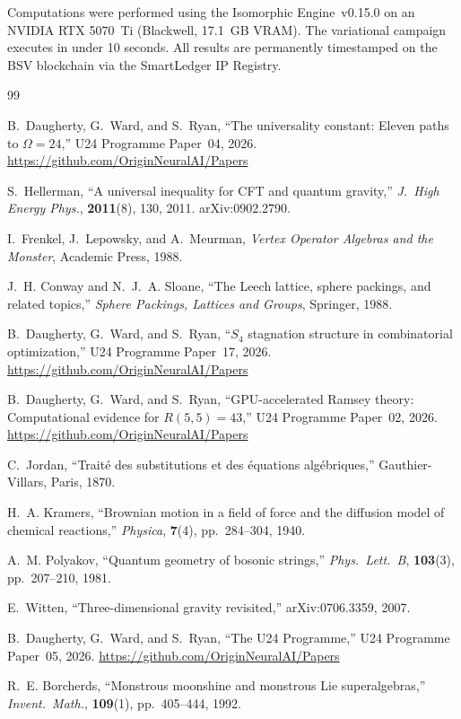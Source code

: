 \documentclass[12pt,a4paper]{article}
\theoremstyle{definition}
\theoremstyle{remark}
\begin{document}
Computations were performed using the Isomorphic Engine~v0.15.0 on an NVIDIA RTX 5070~Ti (Blackwell, 17.1~GB VRAM).  The variational campaign executes in under 10 seconds.  All results are permanently timestamped on the BSV blockchain via the SmartLedger IP Registry.


\begin{thebibliography}{99}

B.~Daugherty, G.~Ward, and S.~Ryan,
``The universality constant: Eleven paths to $\Omega = 24$,''
U24 Programme Paper~04, 2026.
\url{https://github.com/OriginNeuralAI/Papers}

S.~Hellerman,
``A universal inequality for CFT and quantum gravity,''
\textit{J.\ High Energy Phys.}, \textbf{2011}(8), 130, 2011.
arXiv:0902.2790.

I.~Frenkel, J.~Lepowsky, and A.~Meurman,
\textit{Vertex Operator Algebras and the Monster},
Academic Press, 1988.

J.~H. Conway and N.~J.~A. Sloane,
``The Leech lattice, sphere packings, and related topics,''
\textit{Sphere Packings, Lattices and Groups}, Springer, 1988.

B.~Daugherty, G.~Ward, and S.~Ryan,
``$S_4$ stagnation structure in combinatorial optimization,''
U24 Programme Paper~17, 2026.
\url{https://github.com/OriginNeuralAI/Papers}

B.~Daugherty, G.~Ward, and S.~Ryan,
``GPU-accelerated Ramsey theory: Computational evidence for $R(5,5) = 43$,''
U24 Programme Paper~02, 2026.
\url{https://github.com/OriginNeuralAI/Papers}

C.~Jordan,
``Trait\'{e} des substitutions et des \'{e}quations alg\'{e}briques,''
Gauthier-Villars, Paris, 1870.

H.~A. Kramers,
``Brownian motion in a field of force and the diffusion model of chemical reactions,''
\textit{Physica}, \textbf{7}(4), pp.~284--304, 1940.

A.~M. Polyakov,
``Quantum geometry of bosonic strings,''
\textit{Phys.\ Lett.\ B}, \textbf{103}(3), pp.~207--210, 1981.

E.~Witten,
``Three-dimensional gravity revisited,''
arXiv:0706.3359, 2007.

B.~Daugherty, G.~Ward, and S.~Ryan,
``The U24 Programme,''
U24 Programme Paper~05, 2026.
\url{https://github.com/OriginNeuralAI/Papers}

R.~E. Borcherds,
``Monstrous moonshine and monstrous Lie superalgebras,''
\textit{Invent.\ Math.}, \textbf{109}(1), pp.~405--444, 1992.

\end{thebibliography}
\end{document}
